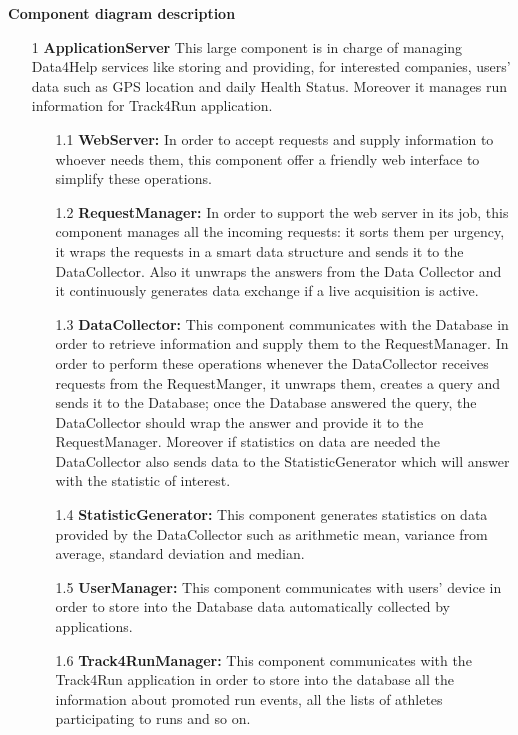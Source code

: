 {\large \textbf{Component diagram description}}
\begin{enumerate}
\item [1] \textbf{ApplicationServer} 
This large component is in charge of managing Data4Help services like storing and providing, for interested companies, users’ data such as GPS location and daily Health Status. Moreover it manages run information for Track4Run application.

	\begin{enumerate}
	\item [1.1] \textbf{WebServer:} In order to accept requests and supply information to whoever needs them, this component offer a friendly web interface to simplify these operations.
		
	\item [1.2] \textbf{RequestManager:} In order to support the web server in its job, this component manages all the incoming requests: it sorts them per urgency, it wraps the requests in a smart data structure and sends it to the DataCollector. Also it unwraps the answers from the Data Collector and it continuously generates data exchange if a live acquisition is active.
		
	\item [1.3] \textbf{DataCollector: } This component communicates with the Database in order to retrieve information and supply them to the RequestManager. In order to perform these operations whenever the DataCollector receives requests from the RequestManger, it unwraps them, creates a query and sends it to the Database; once the Database answered the query, the DataCollector should wrap the answer and provide it to the RequestManager. Moreover if statistics on data are needed the DataCollector also sends data to the StatisticGenerator which will answer with the statistic of interest.
		
	\item [1.4] \textbf{StatisticGenerator: } This component generates statistics on data provided by the DataCollector such as arithmetic mean, variance from average, standard deviation and median.

	\item [1.5] \textbf{UserManager: } This component communicates with users' device in order to store into the Database data automatically collected by applications.

	\item [1.6] \textbf{Track4RunManager: } This component communicates with the Track4Run application in order to store into the database all the information about promoted run events, all the lists of athletes participating to runs and so on.
	

\end{enumerate}
\end{enumerate}
